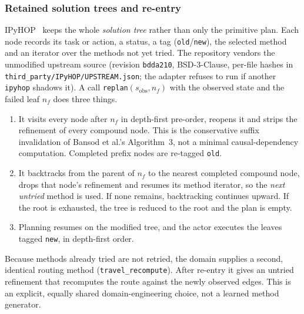 \subsubsection{Retained solution trees and re-entry}
IPyHOP~\cite{bansod2021reentrant} keeps the whole \emph{solution tree} rather than only the primitive
plan. Each node records its task or action, a status, a tag (\texttt{old}/\texttt{new}), the selected
method and an iterator over the methods not yet tried. The repository vendors the unmodified upstream
source (revision \texttt{bdda210}, BSD-3-Clause, per-file hashes in
\texttt{third\_party/IPyHOP/UPSTREAM.json}; the adapter refuses to run if another \texttt{ipyhop} shadows
it). A call \texttt{replan}$(s_{\mathrm{obs}}, n_f)$ with the observed state and the failed leaf $n_f$
does three things.
\begin{enumerate}
  \item It visits every node after $n_f$ in depth-first pre-order, reopens it and strips the refinement
        of every compound node. This is the conservative suffix invalidation of Bansod et al.'s
        Algorithm~3, not a minimal causal-dependency computation. Completed prefix nodes are re-tagged
        \texttt{old}.
  \item It backtracks from the parent of $n_f$ to the nearest completed compound node, drops that node's
        refinement and resumes its method iterator, so the \emph{next untried} method is used. If none
        remains, backtracking continues upward. If the root is exhausted, the tree is reduced to the root
        and the plan is empty.
  \item Planning resumes on the modified tree, and the actor executes the leaves tagged \texttt{new}, in
        depth-first order.
\end{enumerate}
Because methods already tried are not retried, the domain supplies a second, identical routing method
(\texttt{travel\_recompute}). After re-entry it gives an untried refinement that recomputes the route
against the newly observed edges. This is an explicit, equally shared domain-engineering choice, not a
learned method generator.

